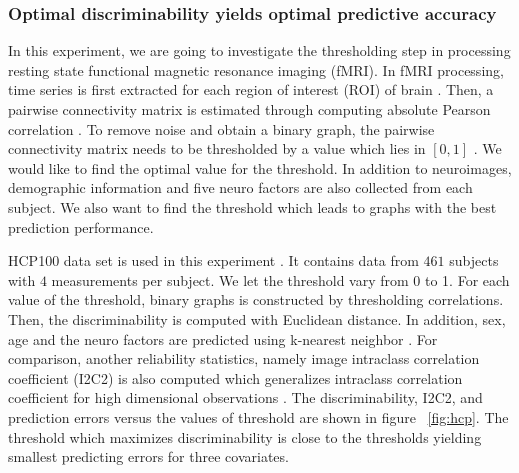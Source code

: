 \documentclass{article}
\begin{document}
\subsubsection{Optimal discriminability yields optimal predictive accuracy}
In this experiment, we are going to investigate the thresholding step in processing resting state functional magnetic resonance imaging (fMRI). In fMRI processing, time series is first extracted for each region of interest (ROI) of brain \cite{strother2006evaluating}. Then, a pairwise connectivity matrix is estimated through computing absolute Pearson correlation \cite{liang2012effects}. To remove noise and obtain a binary graph, the pairwise connectivity matrix needs to be thresholded by a value which lies in $[0,1]$ \cite{hampson2002detection,van2010exploring}. We would like to find the optimal value for the threshold. In addition to neuroimages, demographic information and five neuro factors \cite{costa1992revised} are also collected from each subject. We also want to find the threshold which leads to graphs with the best prediction performance.  

HCP100 data set is used in this experiment \cite{van2012human}. It contains data from $461$ subjects with $4$ measurements per subject. We let the threshold vary from 0 to 1. For each value of the threshold, binary graphs is constructed by thresholding correlations. Then, the discriminability is computed with Euclidean distance. In addition, sex, age and the neuro factors are predicted using k-nearest neighbor \cite{vapnik1998statistical}. For comparison, another reliability statistics, namely image intraclass correlation coefficient (I2C2) is also computed which generalizes intraclass correlation coefficient for high dimensional observations \cite{shou2013quantifying}. The discriminability, I2C2, and prediction errors versus the values of threshold are shown in figure ~\ref{fig:hcp}. The threshold which maximizes discriminability is close to the thresholds yielding smallest predicting errors for three covariates. 
\end{document}
